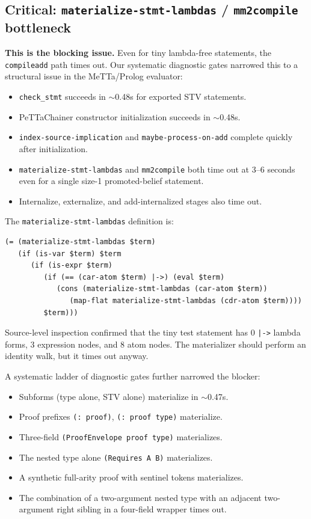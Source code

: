 \documentclass[11pt]{article}
\begin{document}
\subsection{Critical: \texttt{materialize-stmt-lambdas} / \texttt{mm2compile} bottleneck}

\textbf{This is the blocking issue.} Even for tiny lambda-free statements, the
\texttt{compileadd} path times out. Our systematic diagnostic gates narrowed this
to a structural issue in the MeTTa/Prolog evaluator:

\begin{itemize}[nosep]
  \item \texttt{check\_stmt} succeeds in $\sim$0.48s for exported STV statements.
  \item PeTTaChainer constructor initialization succeeds in $\sim$0.48s.
  \item \texttt{index-source-implication} and \texttt{maybe-process-on-add}
  complete quickly after initialization.
  \item \texttt{materialize-stmt-lambdas} and \texttt{mm2compile} both time out
  at 3--6 seconds even for a single size-1 promoted-belief statement.
  \item Internalize, externalize, and add-internalized stages also time out.
\end{itemize}

The \texttt{materialize-stmt-lambdas} definition is:
\begin{lstlisting}
(= (materialize-stmt-lambdas $term)
   (if (is-var $term) $term
      (if (is-expr $term)
         (if (== (car-atom $term) |->) (eval $term)
            (cons (materialize-stmt-lambdas (car-atom $term))
               (map-flat materialize-stmt-lambdas (cdr-atom $term))))
         $term)))
\end{lstlisting}

Source-level inspection confirmed that the tiny test statement has 0 \texttt{|->}
lambda forms, 3 expression nodes, and 8 atom nodes. The materializer should
perform an identity walk, but it times out anyway.

A systematic ladder of diagnostic gates further narrowed the blocker:
\begin{itemize}[nosep]
  \item Subforms (type alone, STV alone) materialize in $\sim$0.47s.
  \item Proof prefixes \texttt{(: proof)}, \texttt{(: proof type)} materialize.
  \item Three-field \texttt{(ProofEnvelope proof type)} materializes.
  \item The nested type alone \texttt{(Requires A B)} materializes.
  \item A synthetic full-arity proof with sentinel tokens materializes.
  \item The combination of a two-argument nested type with an adjacent
  two-argument right sibling in a four-field wrapper times out.
\end{itemize}
\end{document}
